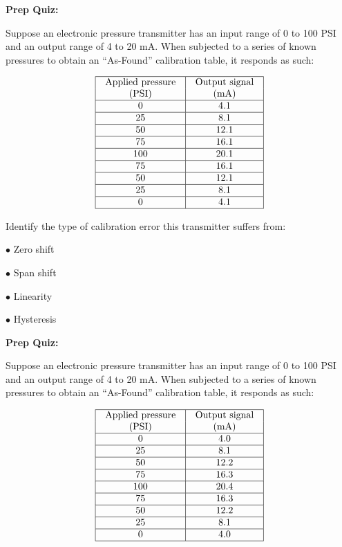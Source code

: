 
\vfil \eject

\noindent
{\bf Prep Quiz:}

Suppose an electronic pressure transmitter has an input range of 0 to 100 PSI and an output range of 4 to 20 mA.  When subjected to a series of known pressures to obtain an ``As-Found'' calibration table, it responds as such:


$$\vbox{\offinterlineskip
\halign{\strut
\vrule \quad\hfil # \ \hfil & 
\vrule \quad\hfil # \ \hfil \vrule \cr
\noalign{\hrule}
%
Applied pressure & Output signal \cr
%
(PSI) & (mA) \cr
%
\noalign{\hrule}
%
0 & 4.1 \cr
%
\noalign{\hrule}
%
25 & 8.1 \cr
%
\noalign{\hrule}
%
50 & 12.1 \cr
%
\noalign{\hrule}
%
75 & 16.1 \cr
%
\noalign{\hrule}
%
100 & 20.1 \cr
%
\noalign{\hrule}
%
75 & 16.1 \cr
%
\noalign{\hrule}
%
50 & 12.1 \cr
%
\noalign{\hrule}
%
25 & 8.1 \cr
%
\noalign{\hrule}
%
0 & 4.1 \cr
%
\noalign{\hrule}
} %
}$$ %

\vskip 10pt

Identify the type of calibration error this transmitter suffers from:

\medskip
\item{$\bullet$} Zero shift
\vskip 5pt 
\item{$\bullet$} Span shift
\vskip 5pt 
\item{$\bullet$} Linearity
\vskip 5pt 
\item{$\bullet$} Hysteresis
\medskip


\vfil \eject

\noindent
{\bf Prep Quiz:}

Suppose an electronic pressure transmitter has an input range of 0 to 100 PSI and an output range of 4 to 20 mA.  When subjected to a series of known pressures to obtain an ``As-Found'' calibration table, it responds as such:


$$\vbox{\offinterlineskip
\halign{\strut
\vrule \quad\hfil # \ \hfil & 
\vrule \quad\hfil # \ \hfil \vrule \cr
\noalign{\hrule}
%
Applied pressure & Output signal \cr
%
(PSI) & (mA) \cr
%
\noalign{\hrule}
%
0 & 4.0 \cr
%
\noalign{\hrule}
%
25 & 8.1 \cr
%
\noalign{\hrule}
%
50 & 12.2 \cr
%
\noalign{\hrule}
%
75 & 16.3 \cr
%
\noalign{\hrule}
%
100 & 20.4 \cr
%
\noalign{\hrule}
%
75 & 16.3 \cr
%
\noalign{\hrule}
%
50 & 12.2 \cr
%
\noalign{\hrule}
%
25 & 8.1 \cr
%
\noalign{\hrule}
%
0 & 4.0 \cr
%
\noalign{\hrule}
} %
}$$ %

